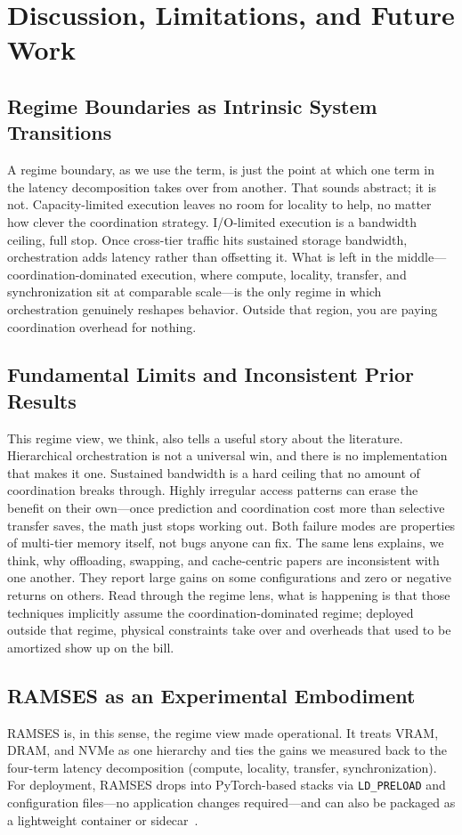 \section{Discussion, Limitations, and Future Work}\label{sec:discussion}

\subsection{Regime Boundaries as Intrinsic System Transitions}
A regime boundary, as we use the term, is just the point at which one term in the latency decomposition takes over from another. That sounds abstract; it is not.
Capacity-limited execution leaves no room for locality to help, no matter how clever the coordination strategy.
I/O-limited execution is a bandwidth ceiling, full stop. Once cross-tier traffic hits sustained storage bandwidth, orchestration adds latency rather than offsetting it.
What is left in the middle---coordination-dominated execution, where compute, locality, transfer, and synchronization sit at comparable scale---is the only regime in which orchestration genuinely reshapes behavior. Outside that region, you are paying coordination overhead for nothing.

\subsection{Fundamental Limits and Inconsistent Prior Results}
This regime view, we think, also tells a useful story about the literature.
Hierarchical orchestration is not a universal win, and there is no implementation that makes it one.
Sustained bandwidth is a hard ceiling that no amount of coordination breaks through. Highly irregular access patterns can erase the benefit on their own---once prediction and coordination cost more than selective transfer saves, the math just stops working out. Both failure modes are properties of multi-tier memory itself, not bugs anyone can fix.
The same lens explains, we think, why offloading, swapping, and cache-centric papers are inconsistent with one another. They report large gains on some configurations and zero or negative returns on others. Read through the regime lens, what is happening is that those techniques implicitly assume the coordination-dominated regime; deployed outside that regime, physical constraints take over and overheads that used to be amortized show up on the bill.

\subsection{RAMSES as an Experimental Embodiment}
RAMSES is, in this sense, the regime view made operational.
It treats VRAM, DRAM, and NVMe as one hierarchy and ties the gains we measured back to the four-term latency decomposition (compute, locality, transfer, synchronization).
For deployment, RAMSES drops into PyTorch-based stacks via \texttt{LD\_PRELOAD} and configuration files---no application changes required---and can also be packaged as a lightweight container or sidecar~\cite{swapAdvisor2020,kwon2023pagedattention}.

